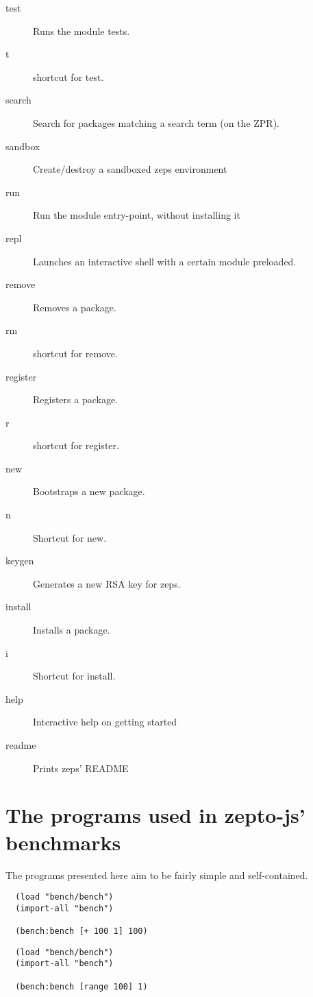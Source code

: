 \documentclass[oneside,11pt,xetex]{scrbook}
\begin{document}
\begin{description}
\item [test] Runs the module tests.
\item [t] shortcut for test.
\item [search] Search for packages matching a search term (on the ZPR).
\item [sandbox] Create/destroy a sandboxed zeps environment
\item [run] Run the module entry-point, without installing it
\item [repl] Launches an interactive shell with a certain module preloaded.
\item [remove] Removes a package.
\item [rm] shortcut for remove.
\item [register] Registers a package.
\item [r] shortcut for register.
\item [new] Bootstraps a new package.
\item [n] Shortcut for new.
\item [keygen] Generates a new RSA key for zeps.
\item [install] Installs a package.
\item [i] Shortcut for install.
\item [help] Interactive help on getting started
\item [readme] Prints zeps' README
\end{description}

\chapter{The programs used in zepto-js' benchmarks}
\label{app:testbench}

The programs presented here aim to be fairly simple and
self-contained.

\begin{listing}[H]
\caption{Integer Addition}
\begin{verbatim}
  (load "bench/bench")
  (import-all "bench")

  (bench:bench [+ 100 1] 100)
\end{verbatim}
\end{listing}

\begin{listing}[H]
\caption{List Creation}
\begin{verbatim}
  (load "bench/bench")
  (import-all "bench")

  (bench:bench [range 100] 1)
\end{verbatim}
\end{listing}
\end{document}
